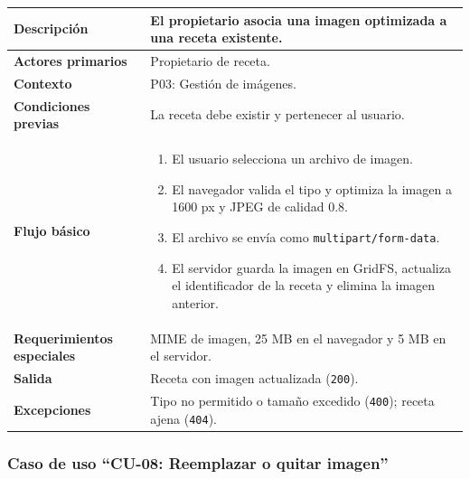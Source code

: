 \documentclass[doc,12pt,a4paper]{apa7}
\begin{document}
\begin{longtable}{|P{3.3cm}|L{11.2cm}|}
\hline
\textbf{Descripción} & El propietario asocia una imagen optimizada a una receta existente. \\ \hline
\textbf{Actores primarios} & Propietario de receta. \\ \hline
\textbf{Contexto} & P03: Gestión de imágenes. \\ \hline
\textbf{Condiciones previas} & La receta debe existir y pertenecer al usuario. \\ \hline
\textbf{Flujo básico} &
\begin{enumerate}
    \item El usuario selecciona un archivo de imagen.
    \item El navegador valida el tipo y optimiza la imagen a 1600 px y JPEG de calidad 0.8.
    \item El archivo se envía como \texttt{multipart/form-data}.
    \item El servidor guarda la imagen en GridFS, actualiza el identificador de la receta y elimina la imagen anterior.
\end{enumerate} \\ \hline
\textbf{Requerimientos especiales} & MIME de imagen, 25 MB en el navegador y 5 MB en el servidor. \\ \hline
\textbf{Salida} & Receta con imagen actualizada (\texttt{200}). \\ \hline
\textbf{Excepciones} & Tipo no permitido o tamaño excedido (\texttt{400}); receta ajena (\texttt{404}). \\ \hline
\end{longtable}

\subsubsection{Caso de uso ``CU-08: Reemplazar o quitar imagen''}
\end{document}

